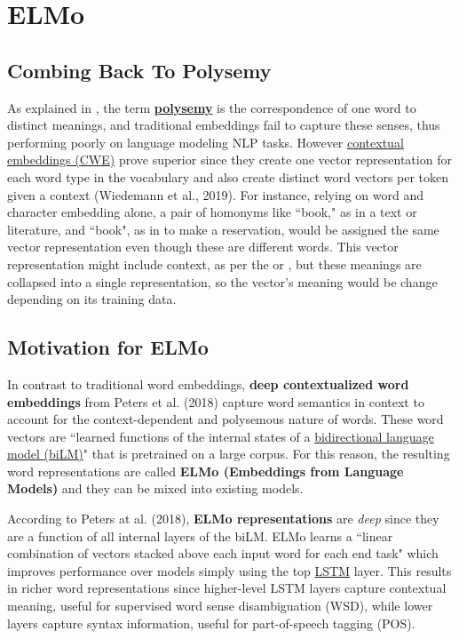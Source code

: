 \section{ELMo} \label{sec:ELMo}


\subsection{Combing Back To Polysemy} \label{sec:PolysemyAgainInElmo} 

As explained in , the term \textbf{\hyperref[sec:Polysemy]{polysemy}} is the correspondence of one word to distinct meanings, and traditional embeddings fail to capture these senses, thus performing poorly on language modeling NLP tasks. However \hyperref[sec:SolutionWithContextEmbs]{contextual embeddings (CWE)} prove superior since they create one vector representation for each word type in the vocabulary and also create distinct word vectors per token given a context (Wiedemann et al., 2019). For instance, relying on word and character embedding alone, a pair of homonyms like ``book," as in a text or literature, and ``book", as in to make a reservation, would be assigned the same vector representation even though these are different words. This vector representation might include context, as per the  or , but these meanings are collapsed into a single representation, so the vector's meaning would be change depending on its training data. 


\subsection{Motivation for ELMo} 


In contrast to traditional word embeddings, \textbf{deep contextualized word embeddings} from Peters et al. (2018) capture word semantics in context to account for the context-dependent and polysemous nature of words. These word vectors are ``learned functions of the internal states of a \hyperref[sec:BidirectionalLM]{bidirectional language model (biLM)}" that is pretrained on a large corpus. For this reason, the resulting word representations are called \textbf{ELMo (Embeddings from Language Models)} and they can be mixed into existing models. 

According to Peters at al. (2018), \textbf{ELMo representations} are \emph{deep} since they are a function of all internal layers of the biLM. ELMo learns a ``linear combination of vectors stacked above each input word for each end task" which improves performance over models simply using the top \hyperref[sec:LSTM]{LSTM} layer. This results in richer word representations since higher-level LSTM layers capture contextual meaning, useful for supervised word sense disambiguation (WSD), while lower layers capture syntax information, useful for part-of-speech tagging (POS). 

